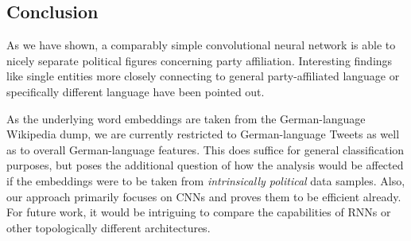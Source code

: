 \documentclass[10pt, oneside]{article}
\begin{document}
\begin{multicols}{2}
\section{Conclusion}

As we have shown, a comparably simple convolutional neural network is able to nicely separate political figures concerning party affiliation. Interesting findings like single entities more closely connecting to general party-affiliated language or specifically different language have been pointed out.

As the underlying word embeddings are taken from the German-language Wikipedia dump, we are currently restricted to German-language Tweets as well as to overall German-language features. This does suffice for general classification purposes, but poses the additional question of how the analysis would be affected if the embeddings were to be taken from \emph{intrinsically political} data samples. 
Also, our approach primarily focuses on CNNs and proves them to be efficient already. For future work, it would be intriguing to compare the capabilities of RNNs or other topologically different architectures. 


\end{multicols}



\end{document}

